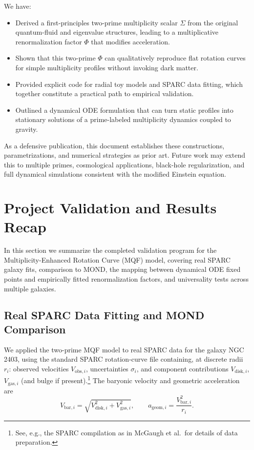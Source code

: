 \documentclass[11pt]{article}
\begin{document}
We have:
\begin{itemize}
\item Derived a first-principles two-prime multiplicity scalar \(\Sigma\) from the original quantum-fluid and eigenvalue structures, leading to a multiplicative renormalization factor \(\Phi\) that modifies acceleration.
\item Shown that this two-prime \(\Phi\) can qualitatively reproduce flat rotation curves for simple multiplicity profiles without invoking dark matter.
\item Provided explicit code for radial toy models and SPARC data fitting, which together constitute a practical path to empirical validation.
\item Outlined a dynamical ODE formulation that can turn static profiles into stationary solutions of a prime-labeled multiplicity dynamics coupled to gravity.
\end{itemize}

As a defensive publication, this document establishes these constructions, parametrizations, and numerical strategies as prior art. Future work may extend this to multiple primes, cosmological applications, black-hole regularization, and full dynamical simulations consistent with the modified Einstein equation.

\section{Project Validation and Results Recap}
\label{sec:validation}

In this section we summarize the completed validation program for the Multiplicity-Enhanced Rotation Curve (MQF) model, covering real SPARC galaxy fits, comparison to MOND, the mapping between dynamical ODE fixed points and empirically fitted renormalization factors, and universality tests across multiple galaxies.

\subsection{Real SPARC Data Fitting and MOND Comparison}

We applied the two-prime MQF model to real SPARC data for the galaxy NGC\,2403, using the standard SPARC rotation-curve file containing, at discrete radii \(r_i\): observed velocities \(V_{\mathrm{obs},i}\), uncertainties \(\sigma_i\), and component contributions \(V_{\mathrm{disk},i}\), \(V_{\mathrm{gas},i}\) (and bulge if present).\footnote{See, e.g., the SPARC compilation as in McGaugh et al.\ for details of data preparation.} The baryonic velocity and geometric acceleration are
\begin{equation}
V_{\mathrm{bar},i} = \sqrt{V_{\mathrm{disk},i}^2 + V_{\mathrm{gas},i}^2},\qquad
a_{\mathrm{geom},i} = \frac{V_{\mathrm{bar},i}^2}{r_i}.
\end{equation}
\end{document}
